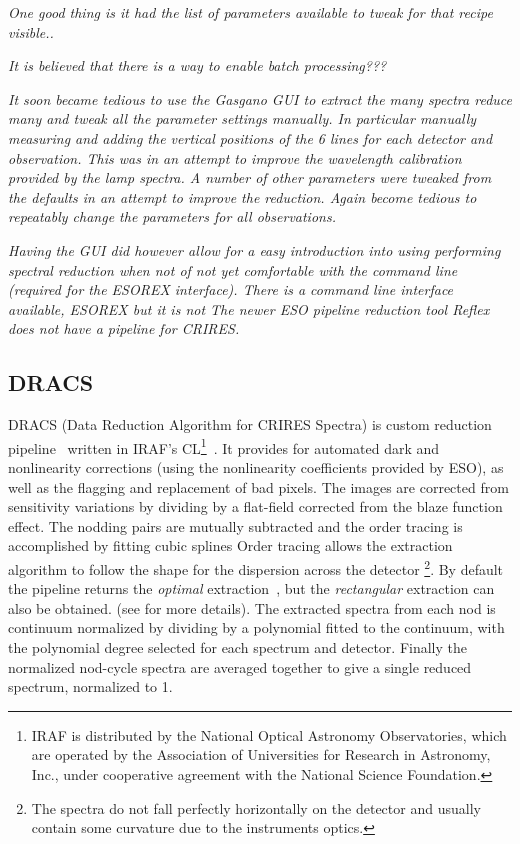 \textit{One good thing is it had the list of parameters available to tweak for that recipe visible..}

\textit{It is believed that there is a way to enable batch processing???}

\textit{It soon became tedious to use the Gasgano GUI to extract the many spectra reduce many and tweak all the parameter settings manually. In particular manually measuring and adding the vertical positions of the 6 {\thar} lines for each detector and observation. This was in an attempt to improve the wavelength calibration provided by the {\thar} lamp spectra.
A number of other parameters were tweaked from the defaults in an attempt to improve the reduction. Again become tedious to repeatably change the parameters for all observations.}

\textit{Having the GUI did however allow for a easy introduction into using performing spectral reduction when not of not yet comfortable with the command line (required for the ESOREX interface).
There is a command line interface available, ESOREX but it is not The newer ESO pipeline reduction tool Reflex does not have a pipeline for CRIRES. }


\subsection{DRACS}
DRACS (Data Reduction Algorithm for CRIRES Spectra) is custom reduction pipeline~\citep{figueira_radial_2010} written in IRAF's CL\footnote{IRAF is distributed by the National Optical Astronomy Observatories, which are operated by the Association of Universities for Research in Astronomy, {Inc.}, under cooperative agreement with the National Science Foundation.}~\citep{tody_iraf_1993}. It provides for automated dark and nonlinearity corrections (using the nonlinearity coefficients provided by ESO), as well as the flagging and replacement of bad pixels. The images are corrected from sensitivity variations by dividing by a flat-field corrected from the blaze function effect. The nodding pairs are mutually subtracted and the order tracing is accomplished by fitting cubic splines
Order tracing allows the extraction algorithm to follow the shape for the dispersion across the detector \footnote{The spectra do not fall perfectly horizontally on the detector and usually contain some curvature due to the instruments optics.}. 
By default the pipeline returns the \emph{optimal }extraction~\citep{horne_optimal_1986}, but the \emph{rectangular} extraction can also be obtained. (see  for more details).
The extracted spectra from each nod is continuum normalized by dividing by a polynomial fitted to the continuum, with the polynomial degree selected for each spectrum and detector. Finally the normalized nod-cycle spectra are averaged together to give a single reduced spectrum, normalized to 1.

